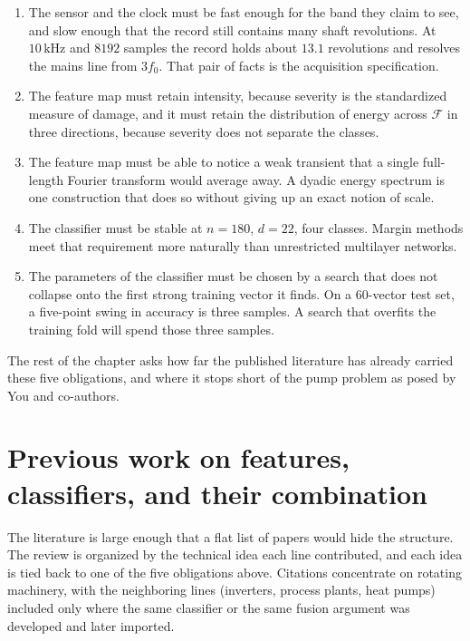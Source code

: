 \begin{enumerate}
\item The sensor and the clock must be fast enough for the band they claim to see, and slow enough that the record still contains many shaft revolutions.
At \(10\,\mathrm{kHz}\) and \(8192\) samples the record holds about \(13.1\) revolutions and resolves the mains line from \(3f_{0}\).
That pair of facts is the acquisition specification.
\item The feature map must retain intensity, because severity is the standardized measure of damage, and it must retain the distribution of energy across \(\mathcal{F}\) in three directions, because severity does not separate the classes.
\item The feature map must be able to notice a weak transient that a single full-length Fourier transform would average away.
A dyadic energy spectrum is one construction that does so without giving up an exact notion of scale.
\item The classifier must be stable at \(n=180\), \(d=22\), four classes.
Margin methods meet that requirement more naturally than unrestricted multilayer networks.
\item The parameters of the classifier must be chosen by a search that does not collapse onto the first strong training vector it finds.
On a \(60\)-vector test set, a five-point swing in accuracy is three samples.
A search that overfits the training fold will spend those three samples.
\end{enumerate}

The rest of the chapter asks how far the published literature has already carried these five obligations, and where it stops short of the pump problem as posed by You and co-authors.

\section{Previous work on features, classifiers, and their combination}
\label{sec:prior}

The literature is large enough that a flat list of papers would hide the structure.
The review is organized by the technical idea each line contributed, and each idea is tied back to one of the five obligations above.
Citations concentrate on rotating machinery, with the neighboring lines (inverters, process plants, heat pumps) included only where the same classifier or the same fusion argument was developed and later imported.

